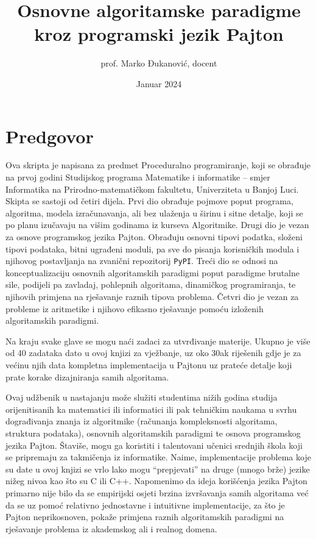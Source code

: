 \documentclass[b4paper,12pt]{book} %
\begin{document}
\author{prof. Marko Đukanović, docent}
\title{Osnovne algoritamske paradigme kroz programski jezik Pajton}
\date{Januar 2024}

 
\maketitle
 
\tableofcontents
 \clearpage
 \setcounter{page}{1}

\chapter*{Predgovor}

Ova skripta je napisana za predmet Proceduralno programiranje, koji se obrađuje na prvoj godini Studijskog programa Matematike i informatike -- smjer Informatika na Prirodno-matematičkom fakultetu, Univerziteta u Banjoj Luci. Skipta se sastoji od četiri dijela. Prvi dio obrađuje pojmove poput  programa, algoritma, modela izraču\-navanja, ali bez ulaženja u širinu i sitne detalje, koji se po planu izučavaju na višim godinama iz kurseva Algoritmike. Drugi dio je vezan za osnove programskog jezika Pajton. Obrađuju  osnovni tipovi podatka, složeni tipovi podataka, bitni ugrađeni moduli, pa sve do pisanja korisničkih modula i njihovog postavljanja na zvanični repozitorij \texttt{PyPI}. Treći dio se odnosi na konceptualizaciju osnovnih algoritamskih paradigmi poput paradigme brutalne sile, podijeli pa zavladaj, pohlepnih algoritama, dinamičkog programiranja, te njihovih primjena na rješavanje raznih tipova problema. Četvri dio je vezan za probleme iz aritmetike i njihovo efikasno rješavanje pomoću izloženih algoritamskih paradigmi. 

 Na kraju svake glave se mogu naći zadaci za utvrđivanje materije. Ukupno je više od 40 zadataka dato u ovoj knjizi za vježbanje, uz oko 30ak riješenih gdje je za većinu njih data kompletna implementacija u Pajtonu uz prateće detalje koji prate korake dizajniranja samih algoritama. 
 
 
 Ovaj udžbenik u nastajanju može služiti studentima nižih godina studija orijenitisanih ka matematici ili informatici ili pak tehničkim naukama u svrhu dograđivanja znanja iz algoritmike (računanja kompleksnosti algoritama, struktura podataka), osnovnih algoritamskih paradigmi te osnova programskog jezika Pajton. Štaviše, mogu ga koristiti i talentovani učenici srednjih škola koji se pripremaju za takmičenja iz informatike. Naime, implementacije problema koje su date u ovoj knjizi se vrlo lako mogu ``prepjevati'' na druge (mnogo brže) jezike nižeg nivoa kao što su C ili C++. Napomenimo da ideja korišćenja jezika Pajton primarno nije bilo da se empirijski osjeti brzina izvršavanja samih algoritama već da se uz pomoć relativno jednostavne i intuitivne implementacije, za što je Pajton neprikosnoven, pokaže primjena raznih algoritamskih paradigmi na rješavanje problema iz akademskog ali i realnog domena.
\end{document}
